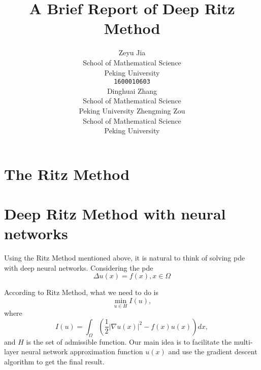\documentclass{article}
\title{A Brief Report of Deep Ritz Method}
\author{
  Zeyu Jia\\School of Mathematical Science\\Peking University\\ \texttt{1600010603} \\
  \And
  Dinghuai Zhang\\School of Mathematical Science\\Peking University
  \And
  Zhengming Zou\\School of Mathematical Science\\Peking University
}
\begin{document}

\maketitle

\begin{abstract}
\end{abstract}


\section{The Ritz Method}


\section{Deep Ritz Method with neural networks}
\par Using the Ritz Method mentioned above, it is natural to think of solving pde with deep neural networks. Considering the pde 
\begin{equation}
\Delta u(x)=f(x),x\in \Omega
\end {equation}
\par According to Ritz Method, what we need to do is
\begin{equation}
\min\limits_{u\in H}{I(u)},
\end{equation}
where
\begin{equation} 
I(u)=\int_\Omega(\frac{1}{2}|\nabla u(x)|^2-f(x)u(x))dx,
\end{equation}
and $H$ is the set of admissible function. Our main idea is to facilitate the multi-layer neural network approximation function $u(x)$ and use the gradient descent algorithm to get the final result.\\
\end{document}
